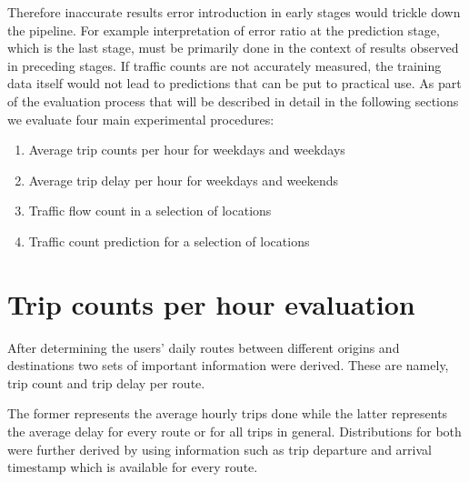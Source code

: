 \documentclass[12pt, a4paper]{report}
\theoremstyle{definition}
\theoremstyle{definition}%
\theoremstyle{definition}%
\theoremstyle{definition}%
\theoremstyle{definition}%
\theoremstyle{definition}%
\begin{document}
Therefore inaccurate results error introduction in early stages would trickle down the pipeline. For example interpretation of error ratio at the prediction stage, which is the last stage, must be primarily  done in the context of results observed in preceding stages. If traffic counts are not accurately measured, the training data itself would not lead to predictions that can be put to practical use. As part of the evaluation process that will be described in detail in the following sections we evaluate four main experimental procedures:

\begin{enumerate}
	\item Average trip counts per hour for weekdays and weekdays
	\item Average trip delay per hour for weekdays and weekends
	\item Traffic flow count in a selection of locations
	\item Traffic count prediction for a selection of locations
\end{enumerate}



\section{Trip counts per hour evaluation}

After determining the users' daily routes between different origins and destinations two sets of important information were derived. These are namely, trip count and trip delay per route. 

The former represents the average hourly trips done while the latter represents the average delay for every route or for all trips in general. Distributions for both were further derived by using information such as trip departure and arrival timestamp which is available for every route. 
\end{document}
